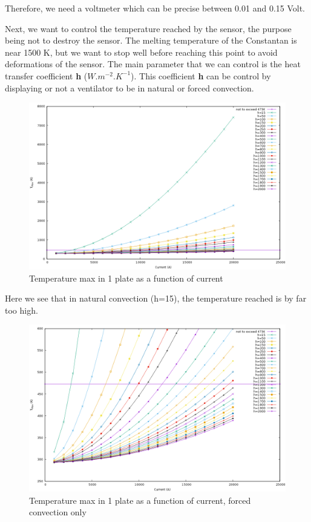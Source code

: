 \documentclass[11pt]{amsart}
\begin{document}
Therefore, we need a voltmeter which can be precise between 0.01 and 0.15 Volt.


Next, we want to control the temperature reached by the sensor, the purpose being not to destroy the sensor.
The melting temperature of the Constantan is near 1500 K, but we want to stop well before reaching this point to avoid deformations of the sensor.
The main parameter that we can control is the heat transfer coefficient \textbf{h} ($W.m^{-2} .K^{-1}$).
This coefficient \textbf{h} can be control by displaying or not a ventilator to be in natural or forced convection.


\begin{figure}[h]{}
\centering\includegraphics[width=9.0truein]{./images/learning/thermoelectric/Temperature_Max.png}
\caption{Temperature max in 1 plate as a function of current}
\centering
\end{figure}

Here we see that in natural convection (h=15), the temperature reached is by far too high.


\begin{figure}[h]{}
\centering\includegraphics[width=9.0truein]{./images/learning/thermoelectric/Temperature_Max_Zoom2.png}
\caption{Temperature max in 1 plate as a function of current, forced convection only}
\centering
\end{figure}
\end{document}
